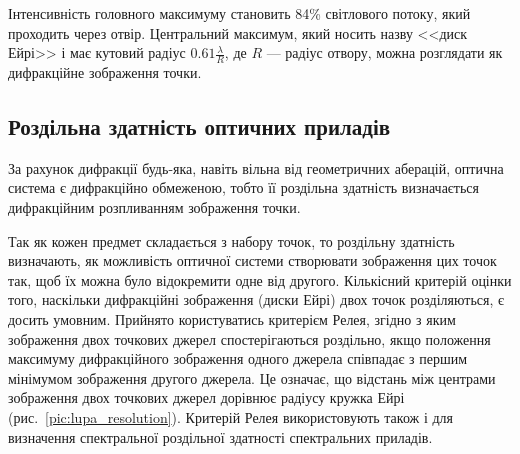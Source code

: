 Інтенсивність головного максимуму становить 84\% світлового потоку, який проходить через отвір. Центральний максимум, який носить назву <<диск Ейрі>> і має кутовий радіус $0.61\frac{\lambda}{R}$, де $ R $ --- радіус отвору, можна розглядати як дифракційне зображення точки.






\subsection*{Роздільна здатність оптичних приладів}



За рахунок дифракції будь-яка, навіть вільна від геометричних аберацій, оптична система є дифракційно обмеженою, тобто її роздільна здатність визначається дифракційним розпливанням зображення точки.

Так як кожен предмет складається з набору точок, то роздільну здатність визначають, як можливість оптичної системи створювати зображення цих точок так, щоб їх можна було відокремити одне від другого.  Кількісний критерій оцінки того, наскільки дифракційні зображення (диски Ейрі) двох точок розділяються, є досить умовним. Прийнято користуватись критерієм Релея, згідно з яким зображення двох точкових джерел спостерігаються роздільно, якщо положення максимуму дифракційного зображення одного джерела співпадає з першим мінімумом зображення другого джерела. Це означає, що відстань між центрами зображення двох точкових джерел дорівнює радіусу кружка Ейрі (рис.~\ref{pic:lupa_resolution}). Критерій Релея використовують  також і для визначення спектральної роздільної здатності спектральних приладів.


